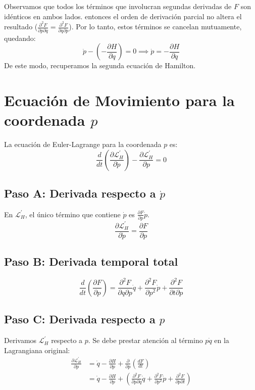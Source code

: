 \documentclass[12pt, a4paper]{article}
\begin{document}
Observamos que todos los términos que involucran segundas derivadas de $F$ son idénticos en ambos lados. entonces el orden de derivación parcial no altera el resultado ($\frac{\partial^2 F}{\partial p \partial q} = \frac{\partial^2 F}{\partial q \partial p}$). Por lo tanto, estos términos se cancelan mutuamente, quedando:
\begin{equation}
    \dot{p} - \left( -\frac{\partial H}{\partial q} \right) = 0 \implies \dot{p} = -\frac{\partial H}{\partial q}
\end{equation}
De este modo, recuperamos la segunda ecuación de Hamilton.

\section*{Ecuación de Movimiento para la coordenada $p$}

La ecuación de Euler-Lagrange para la coordenada $p$ es:
\begin{equation}
    \frac{d}{dt}\left( \frac{\partial \mathcal{L}_{H}^{\prime}}{\partial \dot{p}} \right) - \frac{\partial \mathcal{L}_{H}^{\prime}}{\partial p} = 0
\end{equation}

\subsection*{Paso A: Derivada respecto a $\dot{p}$}
En $\mathcal{L}_{H}^{\prime}$, el único término que contiene $\dot{p}$ es $\frac{\partial F}{\partial p}\dot{p}$.
\begin{equation}
    \frac{\partial \mathcal{L}_{H}^{\prime}}{\partial \dot{p}} = \frac{\partial F}{\partial p}
\end{equation}

\subsection*{Paso B: Derivada temporal total}
\begin{equation}
    \frac{d}{dt}\left( \frac{\partial F}{\partial p} \right) = \frac{\partial^2 F}{\partial q \partial p}\dot{q} + \frac{\partial^2 F}{\partial p^2}\dot{p} + \frac{\partial^2 F}{\partial t \partial p}
\end{equation}

\subsection*{Paso C: Derivada respecto a $p$}
Derivamos $\mathcal{L}_{H}^{\prime}$ respecto a $p$. Se debe prestar atención al término $p\dot{q}$ en la Lagrangiana original:
\begin{align}
    \frac{\partial \mathcal{L}_{H}^{\prime}}{\partial p} &= \dot{q} - \frac{\partial H}{\partial p} + \frac{\partial}{\partial p}\left( \frac{dF}{dt} \right) \nonumber \\
    &= \dot{q} - \frac{\partial H}{\partial p} + \left( \frac{\partial^2 F}{\partial p \partial q}\dot{q} + \frac{\partial^2 F}{\partial p^2}\dot{p} + \frac{\partial^2 F}{\partial p \partial t} \right)
\end{align}
\end{document}
